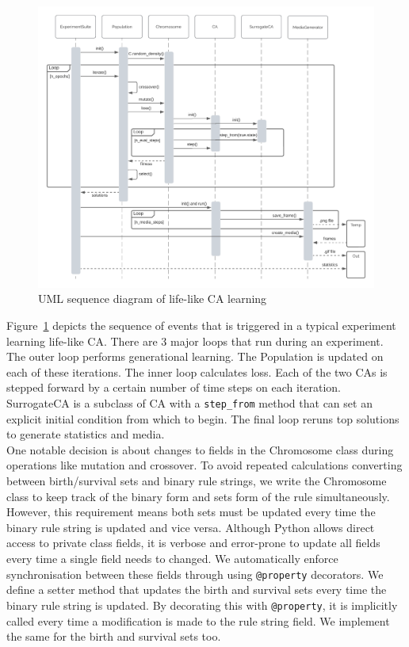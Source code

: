 \begin{figure}[!h]
\centering
    \includegraphics[width=\textwidth]{images/uml_seq.png}
    \caption{UML sequence diagram of life-like CA learning}
\label{fig:uml-seq}
\end{figure}

Figure~\ref{fig:uml-seq} depicts the sequence of events that is triggered in a typical experiment learning life-like CA. There are 3 major loops that run during an experiment. The outer loop performs generational learning. The Population is updated on each of these iterations. The inner loop calculates loss. Each of the two CAs is stepped forward by a certain number of time steps on each iteration. SurrogateCA is a subclass of CA with a \texttt{step\_from} method that can set an explicit initial condition from which to begin. The final loop reruns top solutions to generate statistics and media.\\

One notable decision is about changes to fields in the Chromosome class during operations like mutation and crossover. To avoid repeated calculations converting between birth/survival sets and binary rule strings, we write the Chromosome class to keep track of the binary form and sets form of the rule simultaneously. However, this requirement means both sets must be updated every time the binary rule string is updated and vice versa. Although Python allows direct access to private class fields, it is verbose and error-prone to update all fields every time a single field needs to changed. We automatically enforce synchronisation between these fields through using \texttt{@property} decorators. We define a setter method that updates the birth and survival sets every time the binary rule string is updated. By decorating this with \texttt{@property}, it is implicitly called every time a modification is made to the rule string field. We implement the same for the birth and survival sets too.\\

